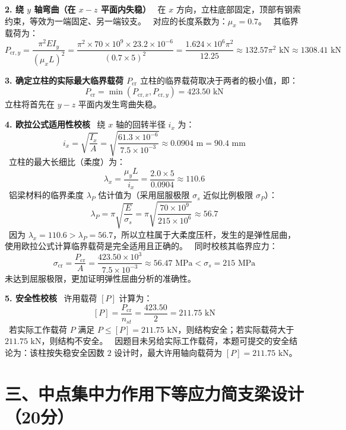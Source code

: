 \documentclass[11pt,a4paper]{ctexrep}
\begin{document}
{\textbf{2. 绕 $y$ 轴弯曲（在 $x-z$ 平面内失稳）}
\noindent\textbullet\ 在 $x$ 方向，立柱底部固定，顶部有钢索约束，等效为一端固定、另一端铰支。
\noindent\textbullet\ 对应的长度系数为：$\mu_x = 0.7$。
\noindent\textbullet\ 其临界载荷为：
    \[
        P_{\text{cr}, y} = \frac{\pi^2 E I_y}{(\mu_x L)^2} = \frac{\pi^2 \times 70 \times 10^9 \times 23.2 \times 10^{-6}}{(0.7 \times 5)^2} = \frac{1.624 \times 10^6 \pi^2}{12.25} \approx 132.57 \pi^2\text{ kN} \approx 1308.41\text{ kN}
    \]

\textbf{3. 确定立柱的实际最大临界载荷 $P_{\text{cr}}$}
立柱的临界载荷取决于两者的极小值，即：
\[
    P_{\text{cr}} = \min(P_{\text{cr}, x}, P_{\text{cr}, y}) = 423.50\text{ kN}
\]
立柱将首先在 $y-z$ 平面内发生弯曲失稳。

\textbf{4. 欧拉公式适用性校核}
\noindent\textbullet\ 绕 $x$ 轴的回转半径 $i_x$ 为：
    \[
        i_x = \sqrt{\frac{I_x}{A}} = \sqrt{\frac{61.3 \times 10^{-6}}{7.5 \times 10^{-3}}} \approx 0.0904\text{ m} = 90.4\text{ mm}
    \]
\noindent\textbullet\ 立柱的最大长细比（柔度）为：
    \[
        \lambda_x = \frac{\mu_y L}{i_x} = \frac{2.0 \times 5}{0.0904} \approx 110.6
    \]
\noindent\textbullet\ 铝梁材料的临界柔度 $\lambda_P$ 估计值为（采用屈服极限 $\sigma_s$ 近似比例极限 $\sigma_P$）：
    \[
        \lambda_P = \pi \sqrt{\frac{E}{\sigma_s}} = \pi \sqrt{\frac{70 \times 10^9}{215 \times 10^6}} \approx 56.7
    \]
\noindent\textbullet\ 因为 $\lambda_x = 110.6 > \lambda_P = 56.7$，所以立柱属于大柔度压杆，发生的是弹性屈曲，使用欧拉公式计算临界载荷是完全适用且正确的。
\noindent\textbullet\ 同时校核其临界应力：
    \[
        \sigma_{\text{cr}} = \frac{P_{\text{cr}}}{A} = \frac{423.50 \times 10^3}{7.5 \times 10^{-3}} \approx 56.47\text{ MPa} < \sigma_s = 215\text{ MPa}
    \]
    未达到屈服极限，更加证明弹性屈曲分析的准确性。

\textbf{5. 安全性校核}
\noindent\textbullet\ 许用载荷 $[P]$ 计算为：
    \[
        [P] = \frac{P_{\text{cr}}}{n_{st}} = \frac{423.50}{2} = 211.75\text{ kN}
    \]
\noindent\textbullet\ 若实际工作载荷 $P$ 满足 $P \le [P] = 211.75\text{ kN}$，则结构安全；若实际载荷大于 $211.75\text{ kN}$，则结构不安全。
\noindent\textbullet\ 因题目未另给实际工作载荷，本题可提交的安全结论为：该柱按失稳安全因数 $2$ 设计时，最大许用轴向载荷为 $[P]=211.75\text{ kN}$。




\section*{三、中点集中力作用下等应力简支梁设计（20分）}

}
\end{document}
